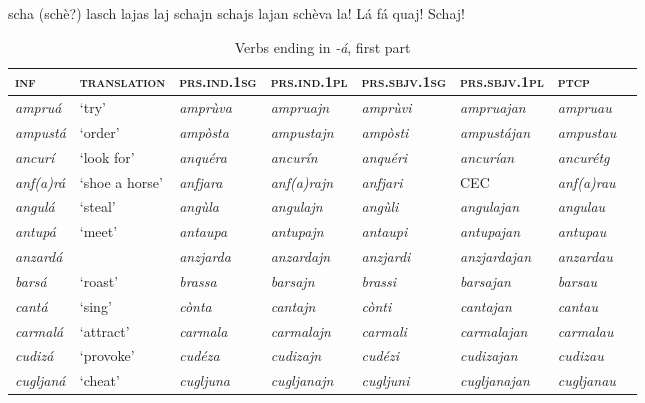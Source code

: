 scha (schè?) lasch lajas laj schajn schajs lajan schèva la! Lá fá quaj! Schaj!
 
\begin{sidewaystable} 
	\caption{Verbs ending in \textit{-á}, first part}
	\label{}
	\begin{tabularx}{\textwidth}{llllllll} 
		\lsptoprule
	\textsc{\textbf{inf}} & \textsc{\textbf{translation}} & \textsc{\textbf{prs.ind.1sg}} & \textsc{\textbf{prs.ind.1pl}} & \textsc{\textbf{prs.sbjv.1sg}} & \textsc{\textbf{prs.sbjv.1pl}} & \textsc{\textbf{ptcp}} \\
	\midrule
		\textit{ampruá} & `try' & \textit{amprùva} & \textit{ampruajn} &  \textit{amprùvi} & \textit{ampruajan} & \textit{ampruau}& \\
		\textit{ampustá} & `order' & \textit{ampòsta} & \textit{ampustajn} & \textit{ampòsti} & \textit{ampustájan} & \textit{ampustau} & \\
		\textit{ancurí} & `look for' & \textit{anquéra} & \textit{ancurín} & \textit{anquéri} & \textit{ancurían} & \textit{ancurétg}& \\
		\textit{anf(a)rá} & ‘shoe a horse’ & \textit{anfjara} & \textit{anf(a)rajn} &  \textit{anfjari} & CEC& \textit{anf(a)rau}& \\ 
		\textit{angulá} & `steal' & \textit{angùla} & \textit{angulajn} & \textit{angùli} & \textit{angulajan} & \textit{angulau}& \\
		\textit{antupá} & `meet' & \textit{antaupa} & \textit{antupajn} & \textit{antaupi} & \textit{antupajan} & \textit{antupau}& \\ 
		\textit{anzardá} & & \textit{anzjarda} & \textit{anzardajn} & \textit{anzjardi} & \textit{anzjardajan} & \textit{anzardau}& \\
		\textit{barsá} & ‘roast’ & \textit{brassa} & \textit{barsajn} & \textit{brassi}& \textit{barsajan} & \textit{barsau} & \\ 
		\textit{cantá} & ‘sing’ & \textit{cònta} & \textit{cantajn} & \textit{cònti} & \textit{cantajan} & \textit{cantau}& \\
		\textit{carmalá} & ‘attract’& \textit{carmala} & \textit{carmalajn} & \textit{carmali} & \textit{carmalajan} & \textit{carmalau}& \\ 
		\textit{cudizá} & ‘provoke’ & \textit{cudéza} & \textit{cudizajn} & \textit{cudézi} & \textit{cudizajan} & \textit{cudizau}& \\ 
		\textit{cugljaná} & ‘cheat’ & \textit{cugljuna} & \textit{cugljanajn} & \textit{cugljuni} & \textit{cugljanajan} & \textit{cugljanau}& \\ 

\end{tabularx}
\end{sidewaystable}
